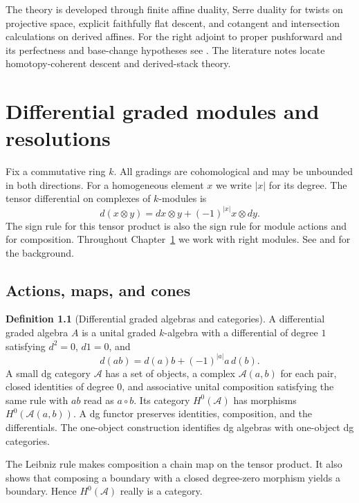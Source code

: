 \documentclass[11pt,oneside,openany]{book}
\theoremstyle{definition}
\newtheorem{definition}[theorem]{Definition}
\theoremstyle{remark}
\begin{document}
The theory is developed through finite affine duality, Serre duality
for twists on projective space, explicit faithfully flat descent, and
cotangent and intersection calculations on derived affines. For the
right adjoint to proper pushforward and its perfectness and base-change
hypotheses see \cite[\S\S12--13]{st-duality}. The literature notes
locate homotopy-coherent descent and derived-stack theory.

\mainmatter
\chapter{Differential graded modules and resolutions}
\label{ch:dg-modules}

Fix a commutative ring \(k\). All gradings are cohomological and may be
unbounded in both directions. For a homogeneous element \(x\) we write
\(|x|\) for its degree. The tensor differential on complexes of
\(k\)-modules is
\[
 d(x\otimes y)=dx\otimes y+(-1)^{|x|}x\otimes dy .
\]
The sign rule for this tensor product is also the sign rule for module
actions and for composition. Throughout Chapter~\ref{ch:dg-modules}
we work with right modules. See \cite[\S\S2.2, 3.1--3.2]{keller}
and \cite[\S\S3.3--3.4]{yekutieli} for the background.

\section{Actions, maps, and cones}

\begin{definition}[Differential graded algebras and categories]\label{res:G01}
A differential graded algebra \(A\) is a unital graded \(k\)-algebra
with a differential of degree \(1\) satisfying \(d^2=0\), \(d1=0\), and
\[
 d(ab)=d(a)b+(-1)^{|a|}a\,d(b).
\]
A small dg category \(\mathcal A\) has a set of objects, a complex
\(\mathcal A(a,b)\) for each pair, closed identities of degree \(0\),
and associative unital composition satisfying the same rule with
\(ab\) read as \(a\circ b\). Its category \(H^0(\mathcal A)\) has morphisms
\(H^0(\mathcal A(a,b))\). A dg functor preserves identities,
composition, and the differentials. The one-object construction
identifies dg algebras with one-object dg categories.
\end{definition}
The Leibniz rule makes composition a chain map on the tensor product.
It also shows that composing a boundary with a closed degree-zero
morphism yields a boundary. Hence \(H^0(\mathcal A)\) really is a category.
\end{document}
